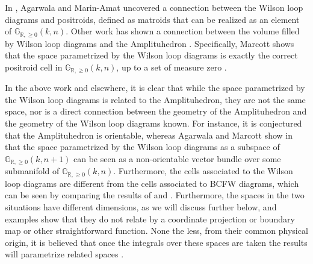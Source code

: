 \documentclass[11pt]{article}
\newcommand{\hlfix}[2]{\texthl{#1}\todo{#2}}
\newcommand{\R}{\mathbb{R}}
\newcommand{\Gr}{\mathbb{G}_{\R, \geq 0}}
\theoremstyle{remark}
\theoremstyle{definition}
\begin{document}

In \cite{wilsonloop}, Agarwala and Marin-Amat uncovered a connection between the Wilson loop diagrams and positroids, defined as matroids that can be realized as an element of $\Gr(k,n)$. Other work has shown a connection between the volume filled by Wilson loop diagrams and the Amplituhedron \cite{casestudy, Amplituhedronsquared}. Specifically, Marcott shows that the space parametrized by the Wilson loop diagrams is  exactly the correct positroid cell in $\Gr(k,n)$, up to a set of measure zero \cite{WLDdim}. 

In the above work and elsewhere, it is clear that while the space parametrized by the Wilson loop diagrams is related to the Amplituhedron, they are not the same space, nor is a direct connection between the geometry of the Amplituhedron and the geometry of the Wilson loop diagrams known. For instance, it is conjectured that the Amplituhedron is orientable, whereas Agarwala and Marcott show in \cite{non-orientable} that the space parametrized by the Wilson loop diagrams as a subspace of $\Gr(k, n+1)$ can be seen as a non-orientable vector bundle over some submanifold of $\Gr(k,n)$. Furthermore, the cells associated to the Wilson loop diagrams are different from the cells associated to BCFW diagrams, which can be seen by comparing the results of \cite{AmplituhedronDecomposition} and \cite{casestudy}. Furthermore, the spaces in the two situations have different dimensions, as we will discuss further below, and examples show \cite{HeslopStewart} that they do not relate by a coordinate projection or boundary map or other straightforward function.  None the less, from their common physical origin, it is believed that once the integrals over these spaces are taken the results will parametrize related spaces \cite{wilsonloop, Amplituhedronsquared}. 
\end{document}
